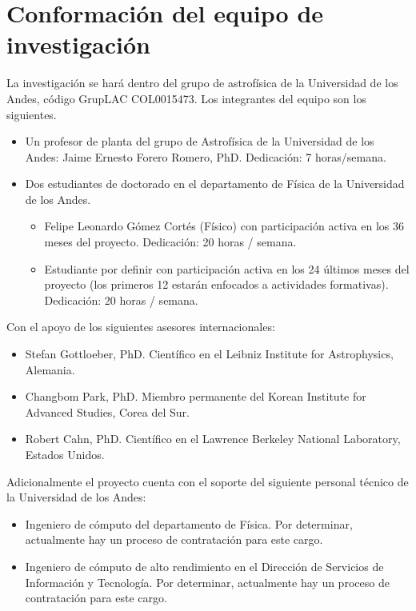 \section{Conformaci\'on del equipo de investigaci\'on}

La investigaci\'on se har\'a dentro del grupo de astrof\'isica de la
Universidad de los Andes, c\'odigo GrupLAC COL0015473. 
Los integrantes del equipo son los siguientes. 


\begin{itemize}
\item Un profesor de planta del grupo de Astrof\'isica de la
  Universidad de los Andes: Jaime Ernesto  Forero Romero, PhD.
  Dedicaci\'on: 7 horas/semana.
\item Dos estudiantes de doctorado en el departamento de F\'isica de
  la Universidad de los Andes.
\begin{itemize}
\item Felipe Leonardo G\'omez Cort\'es (F\'isico) con participaci\'on activa en los 36 meses del proyecto. Dedicaci\'on: 20 horas / semana.  
  \item Estudiante por definir con participaci\'on activa en los 24 \'ultimos
    meses del proyecto (los primeros 12 estar\'an enfocados a
    actividades formativas).  Dedicaci\'on: 20 horas / semana.  
\end{itemize}
\end{itemize}

\noindent
Con el apoyo de los siguientes asesores internacionales:

\begin{itemize}

\item Stefan Gottloeber, PhD. Cient\'ifico en el Leibniz Institute for
  Astrophysics, Alemania.  
\item Changbom Park, PhD. Miembro permanente del Korean Institute for
  Advanced Studies, Corea del Sur. 
\item Robert Cahn, PhD. Cient\'ifico en el Lawrence Berkeley National
  Laboratory, Estados   Unidos. 
\end{itemize}

\noindent
Adicionalmente el proyecto cuenta con el soporte del siguiente
personal t\'ecnico de la Universidad de los Andes:

\begin{itemize}
\item{Ingeniero de c\'omputo del departamento de F\'isica. Por
  determinar, actualmente hay un proceso de contratación para este
  cargo.} 
\item{Ingeniero de c\'omputo de alto rendimiento en el Direcci\'on de
  Servicios de Informaci\'on y Tecnolog\'ia. Por determinar,
  actualmente hay un proceso de contratación para este cargo.} 
\end{itemize}
